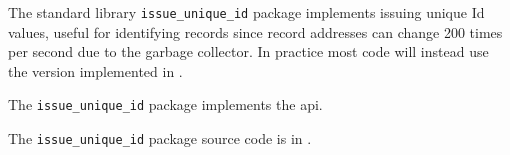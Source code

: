 
The standard library {\tt issue\_unique\_id} package implements issuing unique Id values, useful for identifying records since record addresses can change 200 times per second due to the garbage collector.  In practice most code will instead use the version implemented in .

The {\tt issue\_unique\_id} package implements the  api.

The {\tt issue\_unique\_id} package source code is in .



